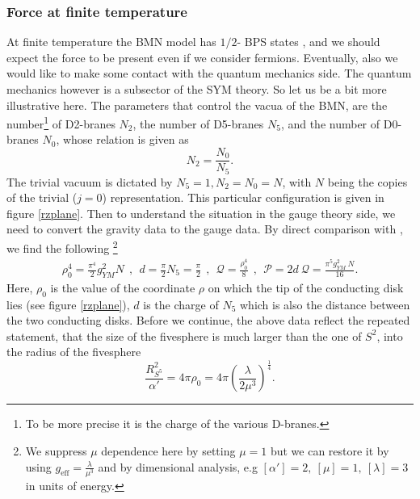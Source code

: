 \documentclass[11pt,english]{article}
\newcommand{\be}{\begin{equation}}
\newcommand{\ee}{\end{equation}}
\numberwithin{equation}{section}
\begin{document}
\subsubsection{Force at finite temperature}\label{sectionfiniteT}
At finite temperature the BMN model has $1/2$- BPS states \cite{Berenstein2002}, \cite{Dasgupta2002} and we should expect the force to be present even if we consider fermions. Eventually, also we would like to make some contact with the quantum mechanics side. The quantum mechanics however is a subsector of  the SYM theory. So
let us be a bit more illustrative here.  The parameters that control the vacua of the BMN, are the number\footnote{To be more precise it is the charge of the various D-branes.} of D2-branes $N_2$, the number of D5-branes $N_5$, and the number of D0-branes $N_0$, whose relation  is given as \cite{Lin2006}
\be 
N_2=\frac{N_0}{N_5}.
\ee 
The trivial vacuum is dictated by $N_5=1, N_2=N_0=N$, with $N$ being the copies of the trivial ($j=0$) representation. This particular configuration is given in figure \ref{rzplane}. Then to understand the situation in the gauge theory side, we need to convert the gravity data to the gauge data. By direct comparison with \cite{Itzhaki1998}, we find the following \cite{Lin2006}\footnote{We suppress $\mu$ dependence here by setting $\mu=1$ but we can restore it by using $g_{\text{eff}}=\frac{\lambda}{\mu^3}$ and by dimensional analysis, e.g $[\alpha']=2,~ [\mu]=1, ~[\lambda]=3$ in units of energy.}
\begin{align}
\rho_0^4=\frac{\pi^4}{2}g_{YM}^2 N~~,~~d=\frac{\pi}{2}N_5=\frac{\pi}{2}~~,~~\mathcal{Q}=\frac{\rho_0^4}{8}~~,~~  \mathcal{P}=2d\ \mathcal{Q}=\frac{\pi^5g_{YM}^2\ N}{16}.
\end{align}
Here, $\rho_0$ is the value of the coordinate $\rho$ on which the tip of the conducting disk lies (see figure \ref{rzplane}), $d$ is the charge of $N_5$ which is also the distance between the two conducting disks.  Before we continue, the above data reflect the repeated statement, that the size of the fivesphere is much larger than the one of $S^2$,  into the radius of the fivesphere  \cite{Lin2006}
\be 
\frac{R^2_{S^5}}{\alpha'}=4\pi\rho_0=4\pi\left(\frac{\lambda}{2\mu^3}\right)^{\frac{1}{4}}.
\ee  
\end{document}
